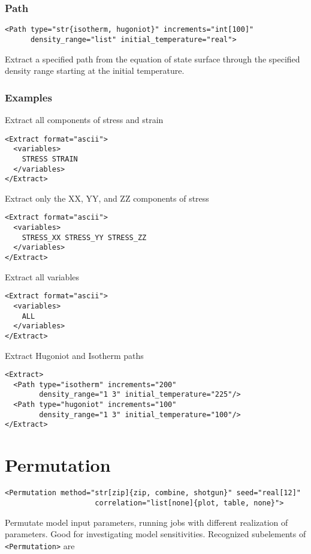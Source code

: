\documentclass[11pt]{report}
\renewcommand{\tag}[1]{\texttt{<#1>}}
\newcommand{\supporting}[1]{\texttt{Supporting Drivers: #1}}
\begin{document}
\subsubsection{Path}
\begin{verbatim}
<Path type="str{isotherm, hugoniot}" increments="int[100]"
      density_range="list" initial_temperature="real">
\end{verbatim}
%
Extract a specified path from the equation of state surface through the
specified density range starting at the initial temperature.

\subsubsection{Examples}
Extract all components of stress and strain
%
\begin{verbatim}
<Extract format="ascii">
  <variables>
    STRESS STRAIN
  </variables>
</Extract>
\end{verbatim}

Extract only the XX, YY, and ZZ components of stress
%
\begin{verbatim}
<Extract format="ascii">
  <variables>
    STRESS_XX STRESS_YY STRESS_ZZ
  </variables>
</Extract>
\end{verbatim}

Extract all variables
\begin{verbatim}
<Extract format="ascii">
  <variables>
    ALL
  </variables>
</Extract>
\end{verbatim}

Extract Hugoniot and Isotherm paths
\begin{verbatim}
<Extract>
  <Path type="isotherm" increments="200"
        density_range="1 3" initial_temperature="225"/>
  <Path type="hugoniot" increments="100"
        density_range="1 3" initial_temperature="100"/>
</Extract>
\end{verbatim}

\section{Permutation}
\begin{verbatim}
<Permutation method="str[zip]{zip, combine, shotgun}" seed="real[12]"
                     correlation="list[none]{plot, table, none}">
\end{verbatim}
%
Permutate model input parameters, running jobs with different realization of
parameters. Good for investigating model sensitivities. Recognized subelements
of \tag{Permutation} are
\end{document}
